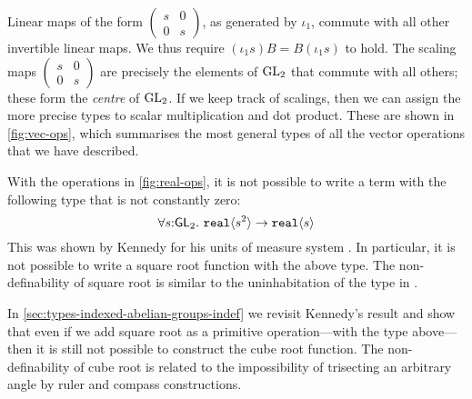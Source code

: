 Linear maps of the form $\left(
  \begin{smallmatrix}s & 0 \\ 0 & s\end{smallmatrix}\right)$, as
generated by $\iota_1$, commute with all other invertible linear
maps. We thus require
$(\iota_1 s)B = B(\iota_1 s)$ to hold.
The scaling maps $\left(
  \begin{smallmatrix}s & 0 \\ 0 & s\end{smallmatrix}\right)$
are precisely the elements of $\mathrm{GL}_2$ that commute with all others;
these form the \emph{centre} of $\mathrm{GL}_2$. If we keep track of
scalings, then we can assign the more precise types to
scalar multiplication and dot product. These
 are shown in \autoref{fig:vec-ops}, which summarises the most general types 
of all the vector operations that we have described.

\begin{example}
  With the operations in \autoref{fig:real-ops}, it is not possible to
  write a term with the following type that is not constantly zero:
  \begin{displaymath}
    \forall s \mathord: \SynGL{2}.\ \tyPrim{real}{s^2} \to \tyPrim{real}{s}
  \end{displaymath}
  This was shown by Kennedy for his units of measure system
  \cite{kennedy97relational}.  In particular, it is not possible to
  write a square root function with the above type.  The
  non-definability of square root is similar to the uninhabitation of the
  type in .

  In \autoref{sec:types-indexed-abelian-groups-indef} we revisit
  Kennedy's result and show that even if we add square root as a
  primitive operation---with the type above---then it is still not
  possible to construct the cube root function. The non-definability of
  cube root is related to the impossibility of trisecting an arbitrary
  angle by ruler and compass constructions.
\end{example}


